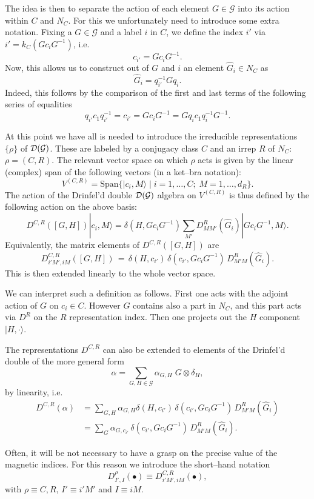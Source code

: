 \documentclass[nofootinbib,superscriptaddress,eqsecnum,tightenlines,11pt]{revtex4-1}
\def\nn{\nonumber}
\def\mG{\mathcal{G}}
\def\be{\begin{equation}}
\def\ee{\end{equation}}
\begin{document}
The idea is then to separate the action of each element $G\in\mG$ into its action within $C$ and $N_C$.
For this we unfortunately need to introduce some extra notation.
Fixing a $G\in\mG$ and a label $i$ in $C$, we define the index $i'$ via $i' = k_C(G c_i G^{-1})$, i.e.
\be
c_{i'} = G c_i G^{-1}.
\ee
Now, this allows us to construct out of $G$ and $i$ an element $\widehat G_i \in N_C$ as
\be
\widehat G_i = q^{-1}_{i'} G q_i.
\ee
Indeed, this follows by the comparison of the first and last terms of the following series of equalities
\be
q_{i'} c_1 q^{-1}_{i'} = c_{i'} = G c_i G^{-1} = G q_i c_1 q_i^{-1} G^{-1}.
\ee

At this point we have all is needed to introduce the irreducible representations $\{\rho\}$ of ${\cal D}(\mG)$. 
These are labeled by a conjugacy class $C$ and an irrep $R$ of $N_C$: $\rho=(C,R)$.
The relevant vector space on which $\rho$ acts is given by the linear (complex) span of the following vectors (in a ket--bra notation):
\be
V^{(C,R)} = \text{Span}\Big\{| c_i, M \rangle  \; \Big|\; i=1,\dots,C; \; M=1,\dots, d_R \Big\}.
\ee
The action of the Drinfel'd double ${\cal D}(\mG)$ algebra on $V^{(C,R)}$ is thus defined by the following action on the above basis:
\be
D^{C,R}([G,H]) | c_i, M\rangle = \delta(H,G c_i G^{-1} ) \sum_{M'} D^R_{M M'} (\widehat G_i) |  G c_i G^{-1} , M \rangle.
\ee
Equivalently, the matrix elements of $D^{C,R}([G,H])$ are 
\be
D^{C,R}_{i'M',iM}([G,H]) \,=\, \delta(H, c_{i'})\, \delta( c_{i'} , G c_i G^{-1}) \, D^R_{M'M}( \widehat G_i).
\ee
This is then extended linearly to the whole vector space.

We can interpret such a definition as follows. First  one acts with the adjoint action of $G$ on $c_i \in C$. However $G$ contains also a part in $N_C$, and this part acts via $D^R$ on the $R$ representation index. Then one projects out the $H$ component $|H,\cdot \rangle$.

The representations $D^{C,R}$ can also be extended  to elements of the Drinfel'd double of the more general form
\be
\alpha =\sum_{G,H\in\mG} \alpha_{G,H} \;G\otimes \delta_H ,
\ee
by linearity, i.e.
\begin{align}
D^{C,R}(\alpha) 
& = \sum_{G,H} \alpha_{G,H} \delta(H, c_{i'})\, \delta( c_{i'} , G c_i G^{-1}) \, D^R_{M'M}( \widehat G_i)\nn\\
&  =\sum_G \alpha_{G, c_{i'}}\, \delta( c_{i'} , G c_i G^{-1}) \, D^R_{M'M}( \widehat G_i) .
\end{align}

Often, it will be not necessary to have a grasp on the precise value of the magnetic indices.
For this reason we introduce the short--hand notation 
\be
	D^{\rho}_{I',I}({\scriptstyle \bullet}) \equiv  D^{C,R}_{i'M',iM}({\scriptstyle \bullet}) ,
\ee
with $\rho \equiv C,R$, $I' \equiv i'M'$ and $I \equiv iM$.
\end{document}

